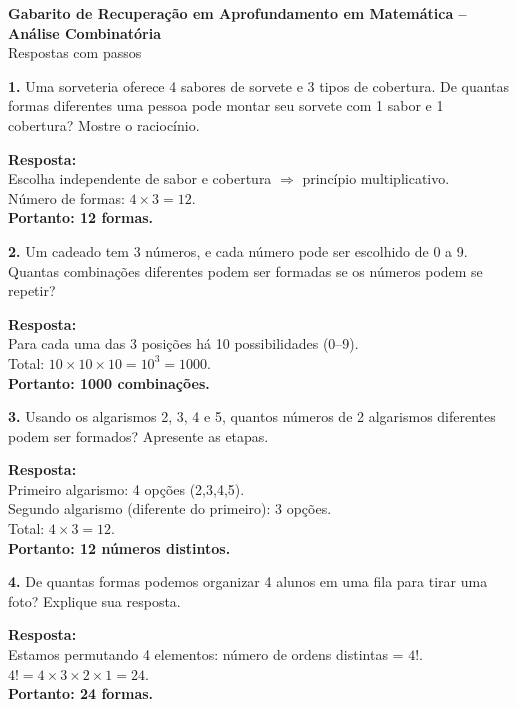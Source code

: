 \documentclass[11pt]{article}
\begin{document}
\begin{center}
    {\LARGE \textbf{Gabarito de Recuperação em Aprofundamento em Matemática – Análise Combinatória}}\\[6pt]
    {\large Respostas com passos}
\end{center}

\bigskip

\textbf{1.} Uma sorveteria oferece 4 sabores de sorvete e 3 tipos de cobertura. De quantas formas diferentes uma pessoa pode montar seu sorvete com 1 sabor e 1 cobertura? Mostre o raciocínio.

\textbf{Resposta:}\\
Escolha independente de sabor e cobertura $\Rightarrow$ princípio multiplicativo.\\
Número de formas: $4 \times 3 = 12$.\\
\textbf{Portanto: 12 formas.}

\bigskip

\textbf{2.} Um cadeado tem 3 números, e cada número pode ser escolhido de 0 a 9. Quantas combinações diferentes podem ser formadas se os números podem se repetir?

\textbf{Resposta:}\\
Para cada uma das 3 posições há 10 possibilidades (0--9).\\
Total: $10 \times 10 \times 10 = 10^3 = 1000$.\\
\textbf{Portanto: 1000 combinações.}

\bigskip

\textbf{3.} Usando os algarismos 2, 3, 4 e 5, quantos números de 2 algarismos diferentes podem ser formados? Apresente as etapas.

\textbf{Resposta:}\\
Primeiro algarismo: 4 opções (2,3,4,5).\\
Segundo algarismo (diferente do primeiro): 3 opções.\\
Total: $4 \times 3 = 12$.\\
\textbf{Portanto: 12 números distintos.}

\bigskip

\textbf{4.} De quantas formas podemos organizar 4 alunos em uma fila para tirar uma foto? Explique sua resposta.

\textbf{Resposta:}\\
Estamos permutando 4 elementos: número de ordens distintas = $4!$.\\
$4! = 4 \times 3 \times 2 \times 1 = 24$.\\
\textbf{Portanto: 24 formas.}
\end{document}
